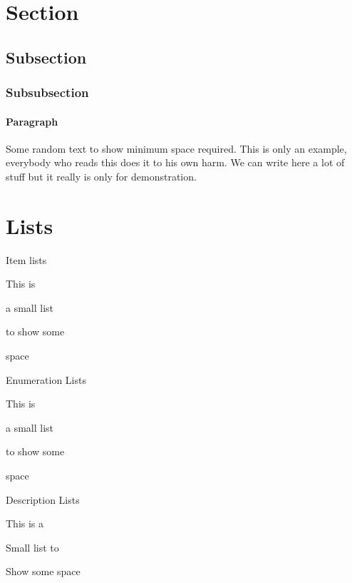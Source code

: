 \documentclass[a4paper]{article}
\begin{document}
\begin{multicols}{3}\scriptsize

    \section{Section}
    \subsection{Subsection}
    \subsubsection{Subsubsection}
    \paragraph{Paragraph}
    Some random text to show minimum space required. This is only an example, everybody who reads this does it to his own harm. We can write here a lot of stuff but it really is only for demonstration.

    \section{Lists}
    Item lists
    \begin{itemize*}
        \item This is
        \item a small list
        \item to show some
        \item space
    \end{itemize*}

    Enumeration Lists
    \begin{enumerate*}
        \item This is
        \item a small list
        \item to show some
        \item space
    \end{enumerate*}

    Description Lists
    \begin{enumerate*}
        \item[This] is a
        \item[Small] list to
        \item[Show] some space
    \end{enumerate*}

    \columnbreak


\end{multicols}
\end{document}
